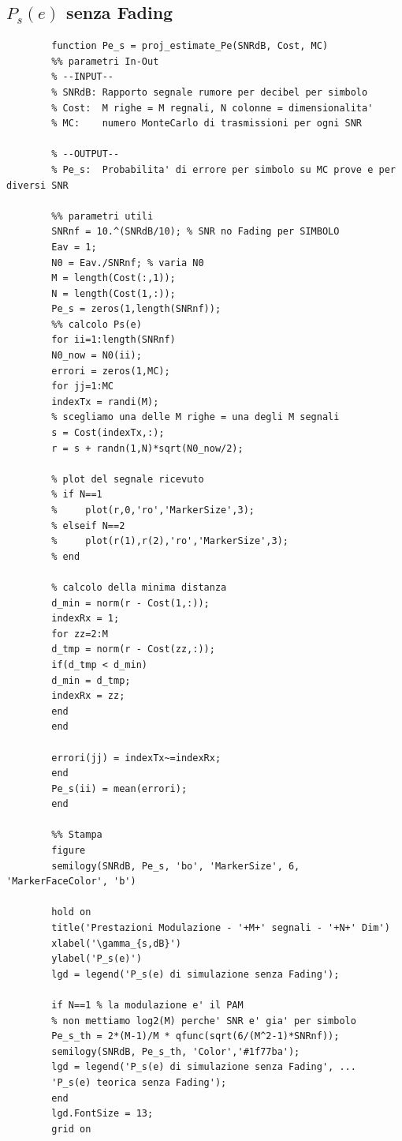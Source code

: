 \documentclass[12pt, a4paper]{article}
\begin{document}
	\subsection{\(P_s(e)\) senza Fading}
	\begin{lstlisting}
		function Pe_s = proj_estimate_Pe(SNRdB, Cost, MC)
		%% parametri In-Out
		% --INPUT--
		% SNRdB: Rapporto segnale rumore per decibel per simbolo
		% Cost:  M righe = M regnali, N colonne = dimensionalita'
		% MC:    numero MonteCarlo di trasmissioni per ogni SNR
		
		% --OUTPUT--
		% Pe_s:  Probabilita' di errore per simbolo su MC prove e per diversi SNR
		
		%% parametri utili
		SNRnf = 10.^(SNRdB/10); % SNR no Fading per SIMBOLO
		Eav = 1; 
		N0 = Eav./SNRnf; % varia N0
		M = length(Cost(:,1));
		N = length(Cost(1,:));
		Pe_s = zeros(1,length(SNRnf));
		%% calcolo Ps(e)
		for ii=1:length(SNRnf)
		N0_now = N0(ii);
		errori = zeros(1,MC);
		for jj=1:MC        
		indexTx = randi(M);
		% scegliamo una delle M righe = una degli M segnali
		s = Cost(indexTx,:);
		r = s + randn(1,N)*sqrt(N0_now/2);
		
		% plot del segnale ricevuto
		% if N==1
		%     plot(r,0,'ro','MarkerSize',3);
		% elseif N==2
		%     plot(r(1),r(2),'ro','MarkerSize',3);
		% end
		
		% calcolo della minima distanza
		d_min = norm(r - Cost(1,:));
		indexRx = 1;
		for zz=2:M
		d_tmp = norm(r - Cost(zz,:));
		if(d_tmp < d_min)
		d_min = d_tmp;
		indexRx = zz;
		end           
		end
		
		errori(jj) = indexTx~=indexRx; 
		end
		Pe_s(ii) = mean(errori);
		end
		
		%% Stampa 
		figure 
		semilogy(SNRdB, Pe_s, 'bo', 'MarkerSize', 6, 'MarkerFaceColor', 'b')
		
		hold on
		title('Prestazioni Modulazione - '+M+' segnali - '+N+' Dim')
		xlabel('\gamma_{s,dB}')
		ylabel('P_s(e)')
		lgd = legend('P_s(e) di simulazione senza Fading');
		
		if N==1 % la modulazione e' il PAM
		% non mettiamo log2(M) perche' SNR e' gia' per simbolo
		Pe_s_th = 2*(M-1)/M * qfunc(sqrt(6/(M^2-1)*SNRnf));
		semilogy(SNRdB, Pe_s_th, 'Color','#1f77ba');
		lgd = legend('P_s(e) di simulazione senza Fading', ...
		'P_s(e) teorica senza Fading');
		end
		lgd.FontSize = 13; 
		grid on
	\end{lstlisting}
\end{document}
